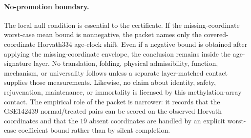 \paragraph{No-promotion boundary.}
The local null condition is essential to the certificate.  If the missing-coordinate worst-case mean bound is nonnegative, the packet names only the covered-coordinate Horvath334 age-clock shift.  Even if a negative bound is obtained after applying the missing-coordinate envelope, the conclusion remains inside the age-signature layer.  No translation, folding, physical admissibility, function, mechanism, or universality follows unless a separate layer-matched contact supplies those measurements.  Likewise, no claim about identity, safety, rejuvenation, maintenance, or immortality is licensed by this methylation-array contact.  The empirical role of the packet is narrower: it records that the GSE142439 normal/treated pairs can be scored on the observed Horvath coordinates and that the $19$ absent coordinates are handled by an explicit worst-case coefficient bound rather than by silent completion.
